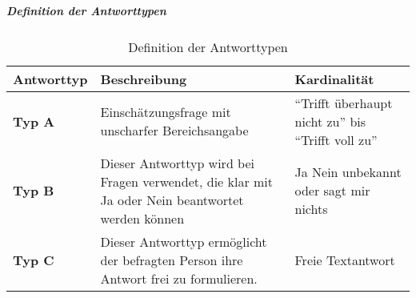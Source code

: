 \documentclass[../../main.tex]{subfiles}
\begin{document}
\subparagraph*{Definition der Antworttypen}\mbox{}


\sloppy 

\begin{table}[H]
\tablefontsize	
\centering
\caption{Definition der Antworttypen}
\label{Definition der Antworttypen}
\begin{tabular}{ |p{2cm}|p{8cm}|p{5cm}|}

\hline
\tableheaderbgcolor
\textbf{Antworttyp} & \textbf{Beschreibung} & \textbf{Kardinalität}\\ 
\hline
\textbf{Typ A} &  Einschätzungsfrage mit unscharfer Bereichsangabe & "`Trifft überhaupt nicht zu"' \newline bis \newline "`Trifft voll zu"' \\
\hline
\textbf{Typ B} &  Dieser Antworttyp wird bei Fragen verwendet, die klar mit Ja oder Nein beantwortet werden können & Ja \newline Nein \newline unbekannt oder sagt mir nichts \\
\hline
\textbf{Typ C} &  Dieser Antworttyp ermöglicht der befragten Person ihre Antwort frei zu formulieren. & Freie Textantwort \\
\hline

\end{tabular}
\end{table}
\end{document}
